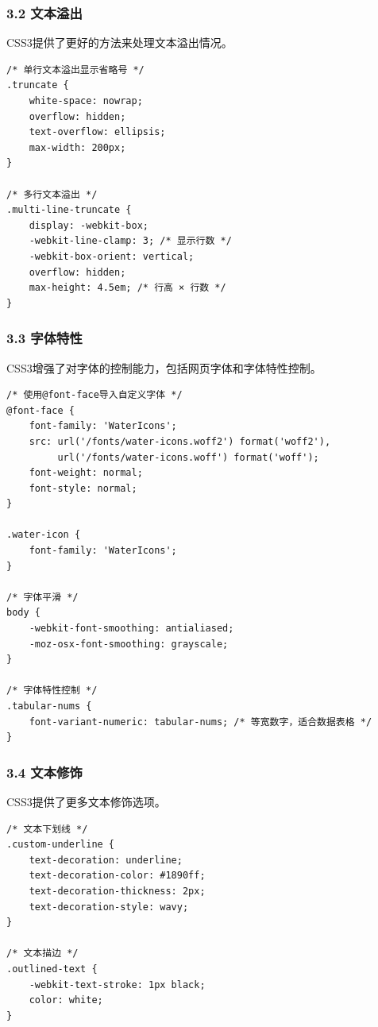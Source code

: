 \subsubsection{3.2 文本溢出}\label{ux6587ux672cux6ea2ux51fa}

CSS3提供了更好的方法来处理文本溢出情况。

\begin{lstlisting}
/* 单行文本溢出显示省略号 */
.truncate {
    white-space: nowrap;
    overflow: hidden;
    text-overflow: ellipsis;
    max-width: 200px;
}

/* 多行文本溢出 */
.multi-line-truncate {
    display: -webkit-box;
    -webkit-line-clamp: 3; /* 显示行数 */
    -webkit-box-orient: vertical;
    overflow: hidden;
    max-height: 4.5em; /* 行高 × 行数 */
}
\end{lstlisting}

\subsubsection{3.3 字体特性}\label{ux5b57ux4f53ux7279ux6027}

CSS3增强了对字体的控制能力，包括网页字体和字体特性控制。

\begin{lstlisting}
/* 使用@font-face导入自定义字体 */
@font-face {
    font-family: 'WaterIcons';
    src: url('/fonts/water-icons.woff2') format('woff2'),
         url('/fonts/water-icons.woff') format('woff');
    font-weight: normal;
    font-style: normal;
}

.water-icon {
    font-family: 'WaterIcons';
}

/* 字体平滑 */
body {
    -webkit-font-smoothing: antialiased;
    -moz-osx-font-smoothing: grayscale;
}

/* 字体特性控制 */
.tabular-nums {
    font-variant-numeric: tabular-nums; /* 等宽数字，适合数据表格 */
}
\end{lstlisting}

\subsubsection{3.4 文本修饰}\label{ux6587ux672cux4feeux9970}

CSS3提供了更多文本修饰选项。

\begin{lstlisting}
/* 文本下划线 */
.custom-underline {
    text-decoration: underline;
    text-decoration-color: #1890ff;
    text-decoration-thickness: 2px;
    text-decoration-style: wavy;
}

/* 文本描边 */
.outlined-text {
    -webkit-text-stroke: 1px black;
    color: white;
}
\end{lstlisting}


